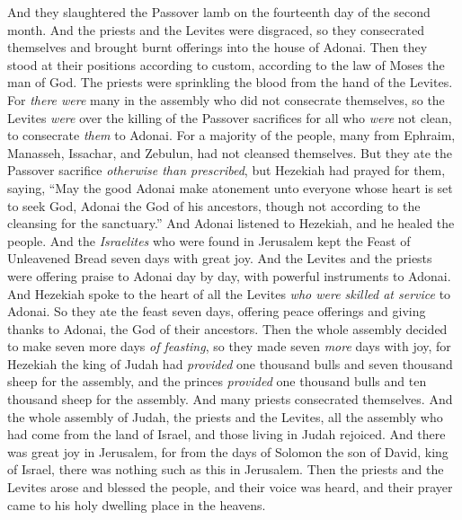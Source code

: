 \begin{biblechapter}
\verse And they slaughtered the Passover lamb on the fourteenth day of the second month. And the priests and the Levites were disgraced, so they consecrated themselves and brought burnt offerings into the house of Adonai.
\verse Then they stood at their positions according to custom, according to the law of Moses the man of God. The priests were sprinkling the blood from the hand of the Levites.
\verse For \textit{there were} many in the assembly who did not consecrate themselves, so the Levites \textit{were} over the killing of the Passover sacrifices for all who \textit{were} not clean, to consecrate \textit{them} to Adonai.
\verse For a majority of the people, many from Ephraim, Manasseh, Issachar, and Zebulun, had not cleansed themselves. But they ate the Passover sacrifice \textit{otherwise than prescribed}, but Hezekiah had prayed for them, saying, “May the good Adonai make atonement unto
\verse everyone whose heart is set to seek God, Adonai the God of his ancestors, though not according to the cleansing for the sanctuary.”
\verse And Adonai listened to Hezekiah, and he healed the people.
\verse And the \textit{Israelites} who were found in Jerusalem kept the Feast of Unleavened Bread seven days with great joy. And the Levites and the priests were offering praise to Adonai day by day, with powerful instruments to Adonai.
\verse And Hezekiah spoke to the heart of all the Levites \textit{who were skilled at service} to Adonai. So they ate the feast seven days, offering peace offerings and giving thanks to Adonai, the God of their ancestors.
\verse Then the whole assembly decided to make seven more days \textit{of feasting}, so they made seven \textit{more} days with joy,
\verse for Hezekiah the king of Judah had \textit{provided} one thousand bulls and seven thousand sheep for the assembly, and the princes \textit{provided} one thousand bulls and ten thousand sheep for the assembly. And many priests consecrated themselves.
\verse And the whole assembly of Judah, the priests and the Levites, all the assembly who had come from the land of Israel, and those living in Judah rejoiced.
\verse And there was great joy in Jerusalem, for from the days of Solomon the son of David, king of Israel, there was nothing such as this in Jerusalem.
\verse Then the priests and the Levites arose and blessed the people, and their voice was heard, and their prayer came to his holy dwelling place in the heavens.
\end{biblechapter}

